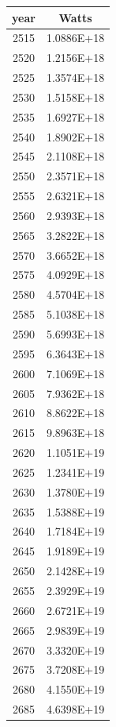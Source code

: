 \documentclass[a4paper]{article}
\begin{document}
	\begin{tabular}{|c|c|}
		\hline
		year & Watts \\
		\hline
		2515 & 1.0886E+18 \\
		\hline
		2520 & 1.2156E+18 \\
		\hline
		2525 & 1.3574E+18 \\
		\hline
		2530 & 1.5158E+18 \\
		\hline
		2535 & 1.6927E+18 \\
		\hline
		2540 & 1.8902E+18 \\
		\hline
		2545 & 2.1108E+18 \\
		\hline
		2550 & 2.3571E+18 \\
		\hline
		2555 & 2.6321E+18 \\
		\hline
		2560 & 2.9393E+18 \\
		\hline
		2565 & 3.2822E+18 \\
		\hline
		2570 & 3.6652E+18 \\
		\hline
		2575 & 4.0929E+18 \\
		\hline
		2580 & 4.5704E+18 \\
		\hline
		2585 & 5.1038E+18 \\
		\hline
		2590 & 5.6993E+18 \\
		\hline
		2595 & 6.3643E+18 \\
		\hline
		2600 & 7.1069E+18 \\
		\hline
		2605 & 7.9362E+18 \\
		\hline
		2610 & 8.8622E+18 \\
		\hline
		2615 & 9.8963E+18 \\
		\hline
		2620 & 1.1051E+19 \\
		\hline
		2625 & 1.2341E+19 \\
		\hline
		2630 & 1.3780E+19 \\
		\hline
		2635 & 1.5388E+19 \\
		\hline
		2640 & 1.7184E+19 \\
		\hline
		2645 & 1.9189E+19 \\
		\hline
		2650 & 2.1428E+19 \\
		\hline
		2655 & 2.3929E+19 \\
		\hline
		2660 & 2.6721E+19 \\
		\hline
		2665 & 2.9839E+19 \\
		\hline
		2670 & 3.3320E+19 \\
		\hline
		2675 & 3.7208E+19 \\
		\hline
		2680 & 4.1550E+19 \\
		\hline
		2685 & 4.6398E+19 \\

\end{tabular}
\end{document}
